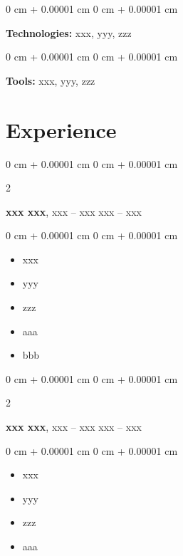 \documentclass[10pt, letterpaper]{article}
\newenvironment{highlights}{
    \begin{itemize}[
        topsep=0.10 cm,
        parsep=0.10 cm,
        partopsep=0pt,
        itemsep=0pt,
        leftmargin=0 cm + 10pt
    ]
}{
    \end{itemize}
} %
\newenvironment{onecolentry}{
    \begin{adjustwidth}{
        0 cm + 0.00001 cm
    }{
        0 cm + 0.00001 cm
    }
}{
    \end{adjustwidth}
} %
\newenvironment{twocolentry}[2][]{
    \onecolentry
    \def\secondColumn{#2}
    \setcolumnwidth{\fill, 4.5 cm}
    \begin{paracol}{2}
}{
    \switchcolumn \raggedleft \secondColumn
    \end{paracol}
    \endonecolentry
} %
\begin{document}
        \begin{onecolentry}
            \textbf{Technologies:} xxx, yyy, zzz
        \end{onecolentry}
        \vspace{0.05 cm}
        \begin{onecolentry}
            \textbf{Tools:} xxx, yyy, zzz
        \end{onecolentry}

    \section{Experience}

        \begin{twocolentry}{
            xxx – xxx
        }
            \textbf{xxx xxx}, xxx -- xxx\end{twocolentry}

        \vspace{0.10 cm}
        \begin{onecolentry}
            \begin{highlights}
                \item xxx
                \item yyy
                \item zzz
                \item aaa
                \item bbb
            \end{highlights}
        \end{onecolentry}

        \vspace{0.2 cm}

        \begin{twocolentry}{
            xxx – xxx
        }
            \textbf{xxx xxx}, xxx -- xxx\end{twocolentry}

        \vspace{0.10 cm}
        \begin{onecolentry}
            \begin{highlights}
                \item xxx
                \item yyy
                \item zzz
                \item aaa
                
            \end{highlights}
        \end{onecolentry}
\end{document}

